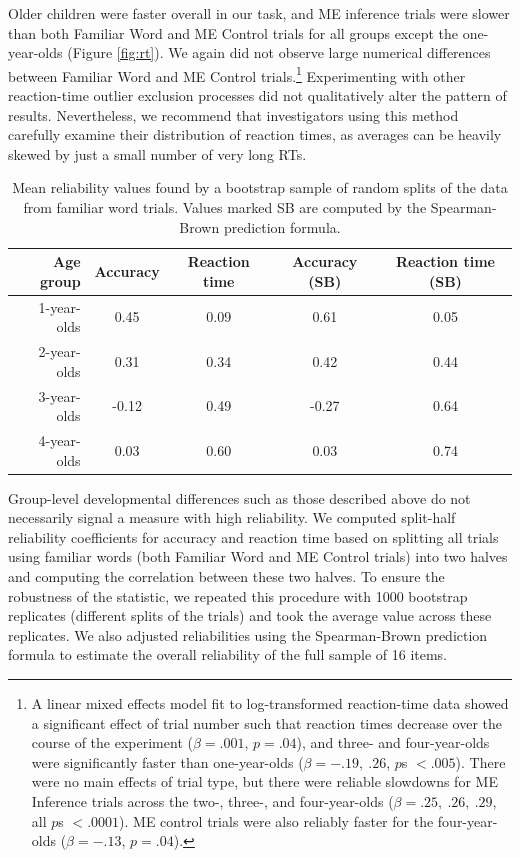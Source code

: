 \documentclass[man,noapacite]{apa2}
\begin{document}
Older children were faster overall in our task, and ME inference trials were slower than both Familiar Word and ME Control trials for all groups except the one-year-olds (Figure \ref{fig:rt}). We again did not observe large numerical differences between Familiar Word and ME Control trials.\footnote{A linear mixed effects model fit to log-transformed reaction-time data showed a significant effect of trial number such that reaction times decrease over the course of the experiment ($\beta = .001$, $p = .04$), and three- and four-year-olds were significantly faster than one-year-olds ($\beta = -.19,~.26$, $p$s $<.005$). There were no main effects of trial type, but there were reliable slowdowns for ME Inference trials across the two-, three-, and four-year-olds ($\beta=.25,~.26,~.29$, all $p$s $< .0001$). ME control trials were also reliably faster for the four-year-olds ($\beta=-.13$, $p=.04$).} Experimenting with other reaction-time outlier exclusion processes did not qualitatively alter the pattern of results. Nevertheless, we recommend that investigators using this method carefully examine their distribution of reaction times, as averages can be heavily skewed by just a small number of very long RTs.

\begin{table}[t]
\centering
\caption{\label{tab:reliability} Mean reliability values found by a bootstrap sample of random splits of the data from familiar word trials. Values marked SB are computed by the Spearman-Brown prediction formula.}
\begin{tabular}{rcccc}
  \hline
Age group & Accuracy & Reaction time & Accuracy (SB) & Reaction time (SB) \\ 
  \hline
1-year-olds & 0.45 & 0.09 & 0.61 & 0.05 \\ 
2-year-olds & 0.31 & 0.34 & 0.42 & 0.44 \\ 
3-year-olds & -0.12 & 0.49 & -0.27 & 0.64 \\ 
4-year-olds & 0.03 & 0.60 & 0.03 & 0.74 \\ 
   \hline
\end{tabular}
\end{table}

Group-level developmental differences such as those described above do not necessarily signal a measure with high reliability. We computed split-half reliability coefficients for accuracy and reaction time based on splitting all trials using familiar words (both Familiar Word and ME Control trials) into two halves and computing the correlation between these two halves. To ensure the robustness of the statistic, we repeated this procedure with 1000 bootstrap replicates (different splits of the trials) and took the average value across these replicates. We also adjusted reliabilities using the Spearman-Brown prediction formula \cite{bartko1976} to estimate the overall reliability of the full sample of 16 items.
\end{document}

